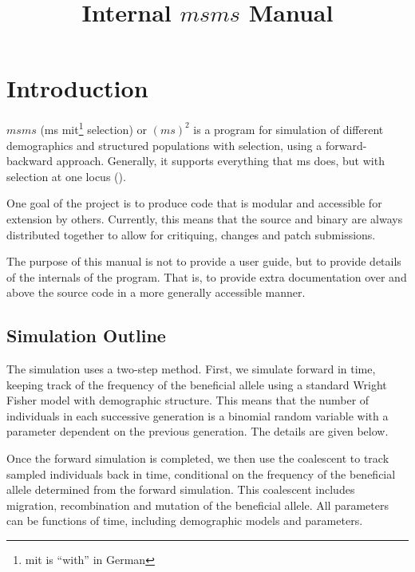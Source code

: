 \documentclass{article}
\begin{document}
\title{Internal $msms$ Manual} 
\maketitle 

\section{Introduction}   
 
$msms$ (ms mit\footnote{mit is ``with'' in German} selection) or $(ms)^2$ is a
program for simulation of different demographics and structured populations with
selection, using a forward-backward approach. Generally, it supports everything
that ms does, but with selection at one locus (\cite{ewing_2010}).
 
One goal of the project is to produce code that is modular and accessible for
extension by others. Currently, this means that the source and binary are always
distributed together to allow for critiquing, changes and patch submissions.

The purpose of this manual is not to provide a user guide, but to provide
details of the internals of the program. That is, to provide extra documentation
over and above the source code in a more generally accessible manner. 

\subsection{Simulation Outline}

The simulation uses a two-step method. First, we simulate forward in time,
keeping track of the frequency of the beneficial allele using a standard Wright 
Fisher model with demographic structure. This means that the number of
individuals in each successive generation is a binomial random variable with
a parameter dependent on the previous generation. The details are given below. 

Once the forward simulation is completed, we then use the coalescent to track
sampled individuals back in time, conditional on the frequency of the beneficial
allele determined from the forward simulation. This coalescent includes
migration, recombination and mutation of the beneficial allele. All parameters
can be functions of time, including demographic models and parameters. 

\end{document}
